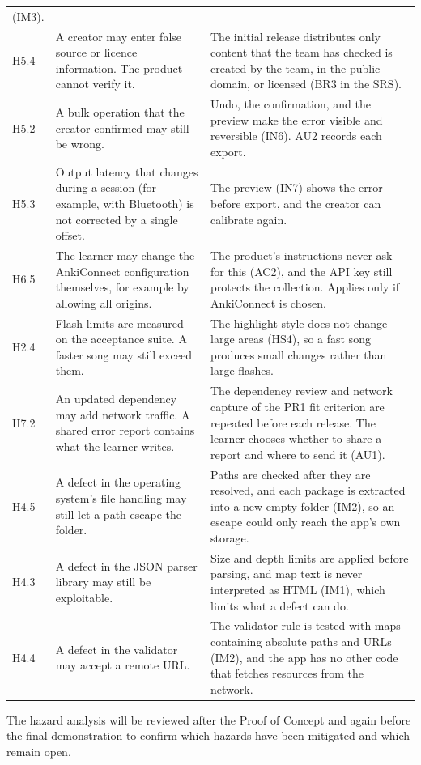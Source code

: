 \documentclass{article}
\begin{document}
{\begin{longtable}{@{}lP{0.42\textwidth}P{0.42\textwidth}@{}}
(IM3).\\
H5.4 & A creator may enter false source or licence information. The product
cannot verify it. & The initial release distributes only content that the
team has checked is created by the team, in the public domain, or licensed
(BR3 in the SRS).\\
H5.2 & A bulk operation that the creator confirmed may still be wrong. &
Undo, the confirmation, and the preview make the error visible and
reversible (IN6). AU2 records each export.\\
H5.3 & Output latency that changes during a session (for example, with
Bluetooth) is not corrected by a single offset. & The preview (IN7) shows the
error before export, and the creator can calibrate again.\\
H6.5 & The learner may change the AnkiConnect configuration themselves, for
example by allowing all origins. & The product's instructions never ask for
this (AC2), and the API key still protects the collection. Applies only if
AnkiConnect is chosen.\\
H2.4 & Flash limits are measured on the acceptance suite. A faster song may
still exceed them. & The highlight style does not change large areas (HS4),
so a fast song produces small changes rather than large flashes.\\
H7.2 & An updated dependency may add network traffic. A shared error report
contains what the learner writes. & The dependency review and network capture of
the PR1 fit criterion are repeated before each release. The learner chooses whether to share a report
and where to send it (AU1).\\
H4.5 & A defect in the operating system's file handling may still let a path
escape the folder. & Paths are checked after they are resolved, and each
package is extracted into a new empty folder (IM2), so an escape could only
reach the app's own storage.\\
H4.3 & A defect in the JSON parser library may still be exploitable. & Size
and depth limits are applied before parsing, and map text is never
interpreted as HTML (IM1), which limits what a defect can do.\\
H4.4 & A defect in the validator may accept a remote URL. & The validator rule
is tested with maps containing absolute paths and URLs (IM2), and the app has no other code that
fetches resources from the network.\\
\bottomrule
\end{longtable}
}

The hazard analysis will be reviewed after the Proof of Concept and again
before the final demonstration to confirm which hazards have been mitigated
and which remain open.
\end{document}
